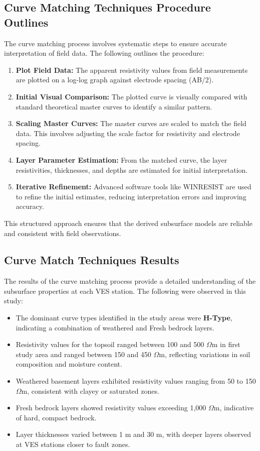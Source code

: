 \documentclass[12pt,a4paper]{report}
\begin{document}
\subsection{Curve Matching Techniques Procedure Outlines}

The curve matching process involves systematic steps to ensure accurate interpretation of field data. The following outlines the procedure:

\begin{enumerate}
    \item \textbf{Plot Field Data:} The apparent resistivity values from field measurements are plotted on a log-log graph against electrode spacing (AB/2).
    \item \textbf{Initial Visual Comparison:} The plotted curve is visually compared with standard theoretical master curves to identify a similar pattern.
    \item \textbf{Scaling Master Curves:} The master curves are scaled to match the field data. This involves adjusting the scale factor for resistivity and electrode spacing.
    \item \textbf{Layer Parameter Estimation:} From the matched curve, the layer resistivities, thicknesses, and depths are estimated for initial interpretation.
    \item \textbf{Iterative Refinement:} Advanced software tools like WINRESIST are used to refine the initial estimates, reducing interpretation errors and improving accuracy.
\end{enumerate}

This structured approach ensures that the derived subsurface models are reliable and consistent with field observations.

\subsection{Curve Match Techniques Results}
The results of the curve matching process provide a detailed understanding of the subsurface properties at each VES station. The following were observed in this study:

\begin{itemize}
    \item The dominant curve types identified in the study areas were \textbf{H-Type}, indicating a combination of weathered and Fresh bedrock layers.
    \item Resistivity values for the topsoil ranged between 100 and 500 $\Omega$m in first study area and ranged between 150 and 450 $\Omega$m, reflecting variations in soil composition and moisture content.
    \item Weathered basement layers exhibited resistivity values ranging from 50 to 150 $\Omega$m, consistent with clayey or saturated zones.
    \item Fresh bedrock layers showed resistivity values exceeding 1,000 $\Omega$m, indicative of hard, compact bedrock.
    \item Layer thicknesses varied between 1 m and 30 m, with deeper layers observed at VES stations closer to fault zones.
\end{itemize}
\end{document}
